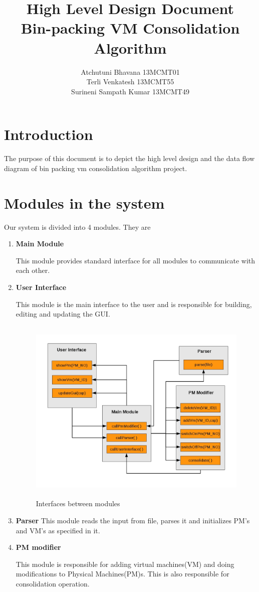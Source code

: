 \documentclass[a4paper,11pt]{article}
\title{High Level Design Document \\ Bin-packing VM Consolidation Algorithm}
\author{Atchutuni Bhavana 13MCMT01  \\ Terli Venkatesh 13MCMT55 \\ Surineni Sampath Kumar 13MCMT49}
\date{}
\begin{document}
\maketitle
\pagebreak
\tableofcontents
\pagebreak

\section{Introduction}
The purpose of this document is to depict the high level
design and the data flow diagram of bin packing
vm consolidation algorithm project.
\section{Modules in the system}
Our system is divided into 4 modules. They are
\begin{enumerate}
\item \textbf{ Main Module }

This module provides standard interface for all modules to communicate with each other.
\item \textbf{ User Interface }

This module is the main interface to the user and is responsible for building, editing and updating the GUI.
\begin{figure}[h]
\centering
\includegraphics[height=9cm]{images/intrfc.jpg} 
\caption{Interfaces between modules}
\label{fig:interfaces}
\end{figure}
\item \textbf{ Parser }
This module reads the input from file, parses it and initializes PM’s and VM’s as specified in it.
\pagebreak
\item \textbf{ PM modifier }

This module is responsible for adding virtual machines(VM) and doing modifications to Physical Machines(PM)s. This is also responsible for consolidation operation.

\end{enumerate}
\end{document}
